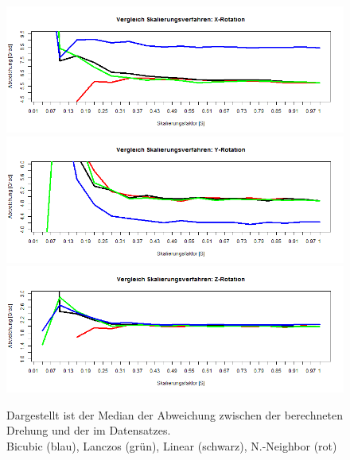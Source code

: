 \begin{figure}
	\centering
	\includegraphics[width=\linewidth]{img_Skalierung/Skal_Diff_RX}
	\includegraphics[width=\linewidth]{img_Skalierung/Skal_Diff_RY}
	\includegraphics[width=\linewidth]{img_Skalierung/Skal_Diff_RZ}
	\caption{Dargestellt ist der Median der Abweichung zwischen der berechneten Drehung und der im Datensatzes.\\
		Bicubic (blau), Lanczos (grün), Linear (schwarz), N.-Neighbor (rot)}
	\label{img_Rot_Dif}
\end{figure}

